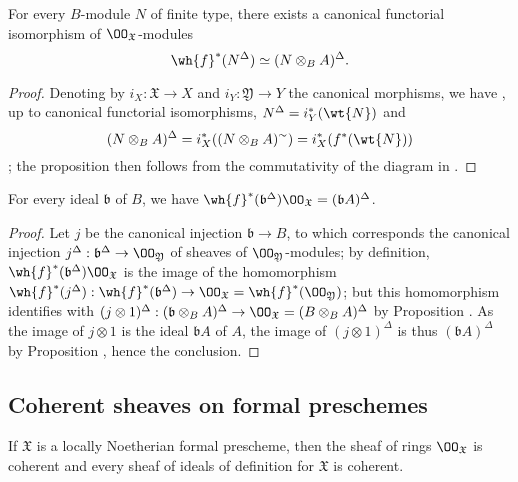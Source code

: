 \begin{prop}[10.10.8]
\label{1.10.10.8}
For every $B$-module $N$ of finite type, there exists a canonical functorial isomorphism of $\OO_\mathfrak{X}$-modules
\[
  \wh{f}^*(N^\Delta)\isoto(N\otimes_B A)^\Delta.
\]
\end{prop}

\begin{proof}
\label{proof-1.10.10.8}
Denoting by $i_X:\mathfrak{X}\to X$ and $i_Y:\mathfrak{Y}\to Y$ the canonical morphisms, we have , up to canonical functorial isomorphisms, $N^\Delta=i_Y^*(\wt{N})$ and
\[
  (N\otimes_B A)^\Delta=i_X^*((N\otimes_B A)^\sim)=i_X^*(f^*(\wt{N}))
\]
; the proposition then follows from the commutativity of the diagram in .
\end{proof}

\begin{cor}
\label{1.10.10.9}
For every ideal $\mathfrak{b}$ of $B$, we have $\wh{f}^*(\mathfrak{b}^\Delta)\OO_\mathfrak{X}=(\mathfrak{b}A)^\Delta$.
\end{cor}

\begin{proof}
\label{proof-1.10.10.9}
Let $j$ be the canonical injection $\mathfrak{b}\to B$, to which corresponds the canonical injection $j^\Delta:\mathfrak{b}^\Delta\to\OO_\mathfrak{Y}$ of sheaves of $\OO_\mathfrak{Y}$-modules; by definition, $\wh{f}^*(\mathfrak{b}^\Delta)\OO_\mathfrak{X}$ is the image of the homomorphism $\wh{f}^*(j^\Delta):\wh{f}^*(\mathfrak{b}^\Delta)\to\OO_\mathfrak{X}=\wh{f}^*(\OO_\mathfrak{Y})$; but this homomorphism identifies with $(j\otimes 1)^\Delta:(\mathfrak{b}\otimes_B A)^\Delta\to\OO_\mathfrak{X}=(B\otimes_B A)^\Delta$ by Proposition .
As the image of $j\otimes 1$ is the ideal $\mathfrak{b}A$ of $A$, the image of $(j\otimes 1)^\Delta$ is thus $(\mathfrak{b}A)^\Delta$ by Proposition , hence the conclusion.
\end{proof}

\subsection{Coherent sheaves on formal preschemes}
\label{subsection:1.10.11}

\begin{prop}[10.11.1]
\label{1.10.11.1}
If $\mathfrak{X}$ is a locally Noetherian formal prescheme, then the sheaf of rings $\OO_\mathfrak{X}$ is coherent and every sheaf of ideals of definition for $\mathfrak{X}$ is coherent.
\end{prop}

